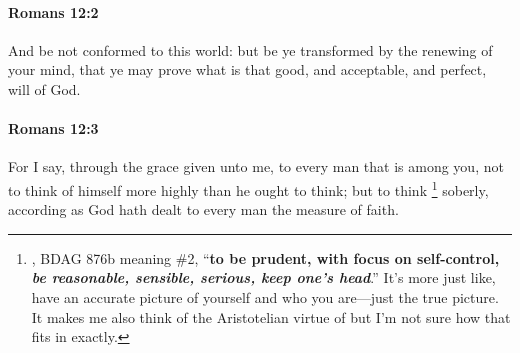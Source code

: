 		\paragraph{Romans 12:2} %
			\label{ROMANS-12-2}

			And be not conformed to this world: but be ye transformed by the renewing of your mind, that ye may prove what is that good, and acceptable, and perfect, will of God.

			\begin{framed}
			\scriptsize
				\begin{compactdesc}
					\item[SBLG] 
				\end{compactdesc}
			\end{framed}

		\paragraph{Romans 12:3} %
			\label{ROMANS-12-3}

			For I say, through the grace given unto me, to every man that is among you, not to think of himself more highly than he ought to think; but to think
				\footnote{%
					, BDAG 876b meaning \#2, ``\textbf{to be prudent, with focus on self-control, \textit{be reasonable, sensible, serious, keep one's head}}.'' It's more just like, have an accurate picture of yourself and who you are---just the true picture. It makes me also think of the Aristotelian virtue of  but I'm not sure how that fits in exactly.
					}%
			soberly, according as God hath dealt to every man the measure of faith.


